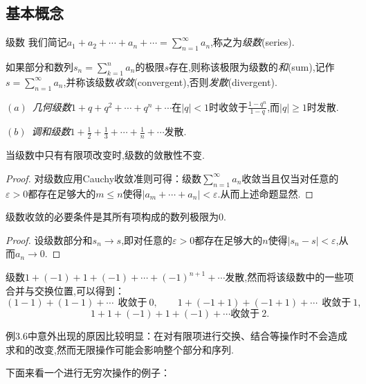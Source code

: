 \subsection{基本概念}

\begin{definition}{级数}
	我们简记$a_1+a_2+\cdots +a_n + \cdots = \sum_{n=1}^{\infty} a_n$,称之为\textit{级数}(series).
	
	如果部分和数列$s_n=\sum_{k=1}^n a_n$的极限$s$存在,则称该极限为级数的\textit{和}(sum),记作$s=\sum_{n=1}^{\infty} a_n$,并称该级数\textit{收敛}(convergent),否则\textit{发散}(divergent).
\end{definition}

\begin{example}
	$(a)$~\textit{几何级数}$1+q+q^2+\cdots +q^n+\cdots$在$|q|<1$时收敛于$\frac{1-q^n}{1-q}$,而$|q|\geq 1$时发散.
	
	$(b)$~\textit{调和级数}$1+\frac{1}{2}+\frac{1}{3}+\cdots + \frac{1}{n} + \cdots$发散.
\end{example}

\begin{proposition}{}
	当级数中只有有限项改变时,级数的敛散性不变.
\end{proposition}
\begin{proof}
	对级数应用Cauchy收敛准则可得：级数$\sum_{n=1}^{\infty} a_n$收敛当且仅当对任意的$\varepsilon >0$都存在足够大的$m \leq n$使得$|a_m + \cdots + a_n|<\varepsilon$.从而上述命题显然.
\end{proof}

\begin{proposition}{}
	级数收敛的必要条件是其所有项构成的数列极限为$0$.
\end{proposition}
\begin{proof}
	设级数部分和$s_n \to s$,即对任意的$\varepsilon >0$都存在足够大的$n$使得$|s_n-s|<\varepsilon$,从而$a_n \to 0$.
\end{proof}

\begin{example}
	级数$1+(-1)+1+(-1)+\cdots +(-1)^{n+1}+\cdots$发散,然而将该级数中的一些项合并与交换位置,可以得到：
	$$(1-1)+(1-1)+\cdots ~~\textit{收敛于}~0, \qquad 1+(-1+1)+(-1+1)+\cdots ~~\textit{收敛于}~1,$$
	$$1+1+(-1)+1+(-1)+\cdots \textit{收敛于}~2.$$
\end{example}

例3.6中意外出现的原因比较明显：在对有限项进行交换、结合等操作时不会造成求和的改变,然而无限操作可能会影响整个部分和序列.

下面来看一个进行无穷次操作的例子：

